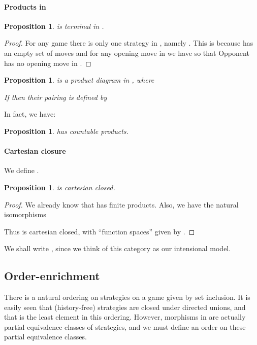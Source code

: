 \documentclass[11pt]{article}
\newtheorem{proposition}[theorem]{Proposition}
\begin{document}
\paragraph{Products in }
\begin{proposition}
 is terminal in .
\end{proposition}
\begin{proof} For any game  there is only one strategy in
, namely . This is because  has an
empty set of moves and for any opening move  in  we have
 so that Opponent has no opening move in .
  \end{proof}


\begin{proposition}

is a product diagram in , where


If  then their pairing
 is defined by


\end{proposition}

In fact, we have:

\begin{proposition}
 has countable products.
\end{proposition}


\paragraph{Cartesian closure}
We define .
\begin{proposition}
 is cartesian closed.
\end{proposition}

\begin{proof} We already know that  has finite products. Also,
we have the natural isomorphisms

Thus  is cartesian closed, with ``function spaces'' given by .
\end{proof}

We shall write , since we think of this category as our
intensional model.

\subsection{Order-enrichment}
There is a natural ordering on strategies on a game 
given by set inclusion.
It is easily seen that (history-free) strategies are closed under directed
unions, and that  is the least element in this ordering.
However, morphisms in  are actually partial equivalence classes
of strategies, and we must define an order on these partial equivalence
classes.
\end{document}
